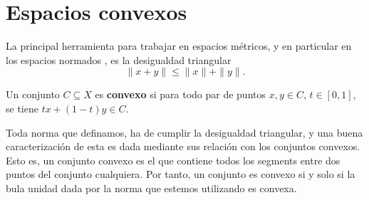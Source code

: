 \section{Espacios convexos}

La principal herramienta para trabajar en espacios métricos, y en particular en los espacios normados \cite{babb}, es la desigualdad triangular 
\begin{equation}
    \| x + y \| \leq \| x \| + \| y \|.
\end{equation}

\begin{definition}
    Un conjunto $ C \subseteq X $ es {\bf convexo} si para todo par de puntos $ x, y \in C $, $ t \in [0, 1] $, se tiene $ tx + (1-t)y \in C $.
\end{definition}

Toda norma que definamos, ha de cumplir la desigualdad triangular, y una buena caracterización de esta es dada mediante sus relación con los conjuntos convexos. Esto es, un conjunto convexo es el que contiene todos los segments entre dos puntos del conjunto cualquiera. Por tanto, un conjunto es convexo si y solo si la bula unidad dada por la norma que estemos utilizando es convexa.

